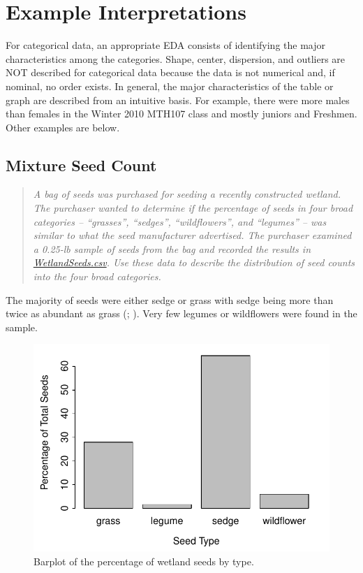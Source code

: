 \documentclass[10pt,openany]{book}\usepackage[]{graphicx}\usepackage[]{color}
\newenvironment{knitrout}{}{} %
\begin{document}
\section{Example Interpretations}
For categorical data, an appropriate EDA consists of identifying the major characteristics among the categories. Shape, center, dispersion, and outliers are NOT described for categorical data because the data is not numerical and, if nominal, no order exists.  In general, the major characteristics of the table or graph are described from an intuitive basis.  For example, there were more males than females in the Winter 2010 MTH107 class and mostly juniors and Freshmen. Other examples are below.

\subsection{Mixture Seed Count}
\vspace{-12pt}
\begin{quote}
\textit{A bag of seeds was purchased for seeding a recently constructed wetland.  The purchaser wanted to determine if the percentage of seeds in four broad categories -- ``grasses'', ``sedges'', ``wildflowers'', and ``legumes'' -- was similar to what the seed manufacturer advertised.  The purchaser examined a 0.25-lb sample of seeds from the bag and recorded the results in \href{https://raw.githubusercontent.com/droglenc/NCData/master/WetlandSeeds.csv}{WetlandSeeds.csv}.  Use these data to describe the distribution of seed counts into the four broad categories.}
\end{quote}



The majority of seeds were either sedge or grass with sedge being more than twice as abundant as grass (; ).  Very few legumes or wildflowers were found in the sample.

\begin{knitrout}
\color{fgcolor}\begin{figure}[hbtp]

{\centering \includegraphics[width=.5\linewidth]{Figs/SeedBarplot-1} 

}

\caption[Barplot of the percentage of wetland seeds by type]{Barplot of the percentage of wetland seeds by type.}\label{fig:SeedBarplot}
\end{figure}


\end{knitrout}
\end{document}
